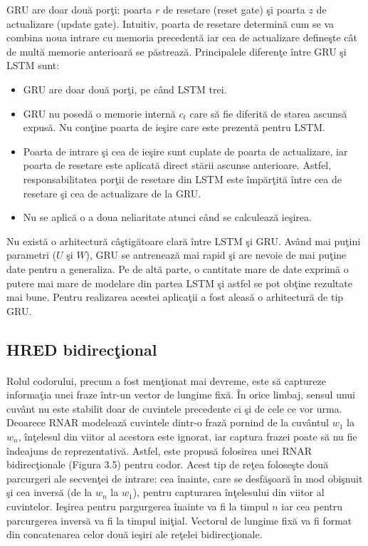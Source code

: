 GRU are doar dou\u a por\c ti: poarta \(r\) de resetare (reset gate) \c si poarta \(z\) de actualizare (update gate). Intuitiv, poarta de resetare determin\u a cum se va combina noua intrare cu memoria precedent\u a iar cea de actualizare define\c ste c\^ at de mult\u a memorie anterioar\u a se p\u astreaz\u a. Principalele diferen\c te \^ intre GRU \c si LSTM sunt:
\begin{itemize}
  \item GRU are doar dou\u a por\c ti, pe c\^ and LSTM trei.
  \item GRU nu posed\u a o memorie intern\u a \(c_{t}\) care s\u a fie diferit\u a de starea ascuns\u a expus\u a. Nu con\c tine poarta de ie\c sire care este prezent\u a pentru LSTM.
  \item Poarta de intrare \c si cea de ie\c sire sunt cuplate de poarta de actualizare, iar poarta de resetare este aplicat\u a direct st\u arii ascunse anterioare. Astfel, responsabilitatea por\c tii de resetare din LSTM este \^ imp\u ar\c tit\u a \^ intre cea de resetare \c si cea de actualizare de la GRU.
  \item Nu se aplic\u a o a doua neliaritate atunci c\^ and se calculeaz\u a ie\c sirea.
\end{itemize}

Nu exist\u a o arhitectur\u a c\^ a\c stig\u atoare clar\u a \^ intre LSTM \c si GRU. Av\^ and mai pu\c tini parametri (\(U\) \c si \(W\)), GRU se antreneaz\u a mai rapid \c si are nevoie de mai pu\c tine date pentru a generaliza. Pe de alt\u a parte, o cantitate mare de date	exprim\u a o putere mai mare de modelare din partea LSTM \c si astfel se pot ob\c tine rezultate mai bune. Pentru realizarea acestei aplica\c tii a fost aleas\u a o arhitectur\u a de tip GRU.

\subsection{HRED bidirec\c tional}

\paragraph{}
Rolul codorului, precum a fost men\c tionat mai devreme, este s\u a captureze informa\c tia unei fraze \^ intr-un vector de lungime fix\u a. \^ In orice limbaj, sensul unui cuv\^ ant nu este stabilit doar de cuvintele precedente ci \c si de cele ce vor urma. Deoarece RNAR modeleaz\u a cuvintele dintr-o fraz\u a pornind de la cuv\^ antul \(w_{1}\) la \(w_{n}\), \^ in\c telesul din viitor al acestora este ignorat, iar captura frazei poate s\u a nu fie \^ indeajuns de reprezentativ\u a. Astfel, este propus\u a folosirea unei RNAR bidirec\c tionale (Figura 3.5) pentru codor. Acest tip de re\c tea folose\c ste dou\u a parcurgeri ale secven\c tei de intrare: cea \^ inainte, care se desf\u a\c soar\u a \^ in mod obi\c snuit \c si cea invers\u a (de la \(w_{n}\) la \(w_{1}\)), pentru capturarea \^ in\c telesului din viitor al cuvintelor. Ie\c sirea pentru pargurgerea \^ inainte va fi la timpul \(n\) iar cea pentru parcurgerea invers\u a va fi la timpul ini\c tial. Vectorul de lungime fix\u a va fi format din concatenarea celor dou\u a ie\c siri ale re\c telei bidirec\c tionale.


